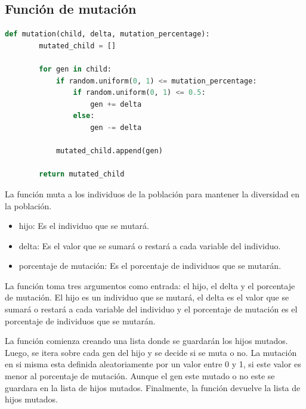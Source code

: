 \documentclass{report}
\begin{document}
    \subsection*{Función de mutación}
    \begin{lstlisting}[language=Python, style=mystyle, caption={Funcion mutacion}]
    def mutation(child, delta, mutation_percentage):
        mutated_child = []
    
        for gen in child:
            if random.uniform(0, 1) <= mutation_percentage:
                if random.uniform(0, 1) <= 0.5:
                    gen += delta
                else:
                    gen -= delta
            
            mutated_child.append(gen)
    
        return mutated_child
    \end{lstlisting}

    La función muta a los individuos de la población para mantener la diversidad en la población.

    \begin{itemize}
        \item hijo: Es el individuo que se mutará.
        \item delta: Es el valor que se sumará o restará a cada variable del individuo.
        \item porcentaje de mutación: Es el porcentaje de individuos que se mutarán.
    \end{itemize}

    La función toma tres argumentos como entrada: el hijo, el delta y el porcentaje de mutación.
    El hijo es un individuo que se mutará, el delta es el valor que se sumará o restará a cada variable del individuo 
    y el porcentaje de mutación es el porcentaje de individuos que se mutarán.

    La función comienza creando una lista donde se guardarán los hijos mutados.
    Luego, se itera sobre cada gen del hijo y se decide si se muta o no.
    La mutación en si misma esta definida aleatoriamente por un valor entre 0 y 1, si este valor es menor al porcentaje de mutación.
    Aunque el gen este mutado o no este se guardara en la lista de hijos mutados.
    Finalmente, la función devuelve la lista de hijos mutados. 
    \newpage
\end{document}
